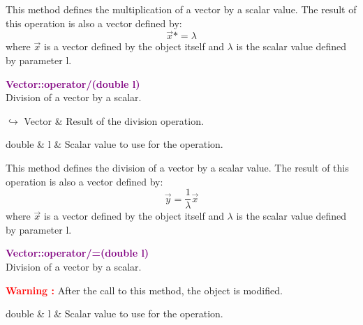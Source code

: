 This method defines the multiplication of a vector by a scalar value.
The result of this operation is also a vector defined by:
\begin{equation*}
\overrightarrow{x} *= \lambda
\end{equation*}
where $\overrightarrow{x}$ is a vector defined by the object itself and $\lambda$ is the scalar value defined by parameter l.

\textcolor{purple}{\textbf{Vector::operator/(double l)}}\label{Vector::operator/(double l)}\\
Division of a vector by a scalar.\vspace*{-0.5em}
\begin{tcolorbox}[grow to left by=-1cm, width=\textwidth-1cm,myArgs,tabularx={l|R}]
$\hookrightarrow$ Vector & Result of the division operation.
\end{tcolorbox}

\begin{tcolorbox}[width=\textwidth,myArgs,tabularx={ll|R}]
double & l & Scalar value to use for the operation.
\end{tcolorbox}

This method defines the division of a vector by a scalar value.
The result of this operation is also a vector defined by:
\begin{equation*}
\overrightarrow{y} = \frac{1}{\lambda} \overrightarrow{x}
\end{equation*}
where $\overrightarrow{x}$ is a vector defined by the object itself and $\lambda$ is the scalar value defined by parameter l.

\textcolor{purple}{\textbf{Vector::operator/=(double l)}}\label{Vector::operator/=(double l)}\\
Division of a vector by a scalar.

\hspace*{10mm}\textcolor{red}{\textbf{Warning :}} After the call to this method, the object is modified.

\begin{tcolorbox}[width=\textwidth,myArgs,tabularx={ll|R}]
double & l & Scalar value to use for the operation.
\end{tcolorbox}

